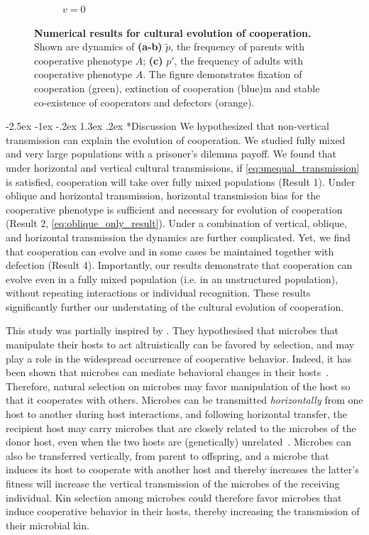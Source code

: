 \documentclass[12pt]{extarticle}
\makeatletter
\renewcommand\section{\@startsection {section}{1}{\z@}%
     {-2.5ex \@plus -1ex \@minus -.2ex}%
     {1.3ex \@plus.2ex}%
    {\Large\bfseries}}
\makeatother
\begin{document}
\begin{figure}[H]
\begin{subfigure}{8cm}
    \caption{$v=0$}
    \label{fig:results_c}
  \end{subfigure}
  \label{fig:results}
  \caption{
  \textbf{Numerical results for cultural evolution of cooperation.}
  Shown are dynamics of \textbf{(a-b)} $\tilde{p}$, the frequency of parents with cooperative phenotype $A$; \textbf{(c)} $p'$, the frequency of adults with cooperative phenotype $A$.
  The figure demonstrates fixation of cooperation (green), extinction of cooperation (blue)m and stable co-existence of cooperators and defectors (orange).
  }
\end{figure}

\section*{Discussion}
We hypothesized that non-vertical transmission can explain the evolution of cooperation.
We studied fully mixed and very large populations with a prisoner's dilemma payoff. 
We found that under horizontal and vertical cultural transmissions, if \autoref{eq:unequal_transmission} is satisfied, cooperation will take over fully mixed populations (Result 1).
Under oblique and horizontal transmission, horizontal transmission bias for the cooperative phenotype is sufficient and necessary for evolution of cooperation (Result 2, \autoref{eq:oblique_only_result}).
Under a combination of vertical, oblique, and horizontal transmission the dynamics are further complicated. Yet, we find that cooperation can evolve and in some cases be maintained together with defection (Result 4). 
Importantly, our results demonstrate that cooperation can evolve even in a fully mixed population (i.e. in an unstructured population), without repeating interactions or individual recognition.
These results significantly further our understating of the cultural evolution of cooperation. 

This study was partially inspired by \citet{lewin2017microbes}. 
They hypothesised that microbes that manipulate their hosts to act altruistically can be favored by selection, and may play a role in the widespread occurrence of cooperative behavior. Indeed, it has been shown that microbes can mediate behavioral changes in their hosts~\citep{dobson1988population,poulin2010parasite}. Therefore, natural selection on microbes may favor manipulation of the host so that it cooperates with others. Microbes can be transmitted \emph{horizontally} from one host to another during host interactions, and following horizontal transfer, the recipient host may carry microbes that are closely related to the microbes of the donor host, even when the two hosts are (genetically) unrelated~\citep{lewin2017microbes}. Microbes can also be transferred vertically, from parent to offspring, and %
a microbe that induces its host to cooperate with another host and thereby increases the latter's fitness will  increase the vertical transmission of the microbes of the receiving individual. Kin selection among microbes could therefore favor microbes that induce cooperative behavior in their hosts, thereby increasing the transmission of their microbial kin.
\end{document}
